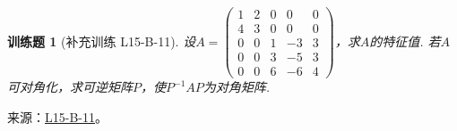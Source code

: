 \documentclass[UTF8,12pt,a4paper,fontset=fandol]{ctexart}
\newtheorem{exercise}{训练题}[section]
\begin{document}
\begin{exercise}[补充训练 L15-B-11]\label{prob:L15-B-11}
设$A=\begin{pmatrix}
                1 & 2 & 0 & 0  & 0 \\ 4 & 3 & 0 & 0 & 0 \\ 0 & 0 & 1 & -3 & 3 \\ 0 & 0 & 3 & -5 & 3 \\
                0 & 0 & 6 & -6 & 4
            \end{pmatrix}$，求$A$的特征值. 若$A$可对角化，求可逆矩阵$P$，使$P^{-1}AP$为对角矩阵.
\end{exercise}
\noindent 来源：\href{https://github.com/yhwu-is/Linear-Algebra-Left-Undone/blob/new/%E8%AE%B2%E4%B9%89/%E4%B8%93%E9%A2%98/15%20%E7%9B%B8%E4%BC%BC%E6%A0%87%E5%87%86%E5%BD%A2%EF%BC%9A%E5%A4%8D%E6%95%B0%E5%9F%9F%E4%B8%8A%E7%9A%84%E5%B0%9D%E8%AF%95%E4%B8%8E%E7%90%86%E8%AE%BA.tex}{L15-B-11}。
\end{document}
